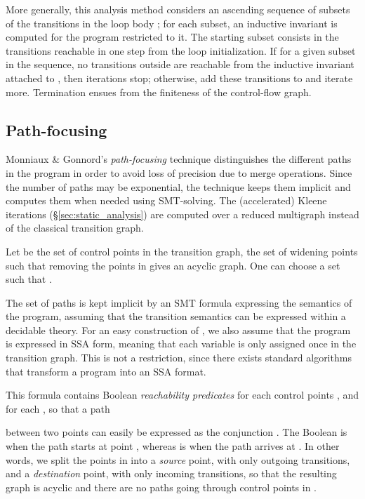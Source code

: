 More generally, this analysis method considers an ascending sequence of subsets of the transitions in the loop body ;
for each subset, an inductive invariant is computed for the program restricted to it.
The starting subset consists in the transitions reachable in one step from the loop initialization.
If for a given subset  in the sequence, no transitions outside  are reachable from the inductive invariant attached to , then iterations stop;
otherwise, add these transitions to  and iterate more.
Termination ensues from the finiteness of the control-flow graph.


\subsection{Path-focusing}
\label{sec:path_focusing}

Monniaux \& Gonnord's \emph{path-focusing} \cite{Monniaux_Gonnord_SAS11} technique
distinguishes the different paths in the program in order to avoid loss of
precision due to merge operations. Since the number of paths may be exponential,
the technique keeps them implicit and computes them when needed using
SMT-solving.
The (accelerated) Kleene iterations (\S\ref{sec:static_analysis}) are computed over a reduced multigraph instead of the classical transition graph.

Let  be the set of control points in the transition graph, 
 the set of widening points
such that removing the points in  gives an acyclic graph.
One can choose a set  such that .

The set of paths is kept implicit by an SMT formula  expressing
the semantics of the program, assuming that the transition semantics can be
expressed within a decidable theory. For an easy construction of , 
we also assume that the program is expressed in SSA form, meaning that each
variable is only assigned once in the transition graph. This is not a
restriction, since there exists standard algorithms that transform a program into
an SSA format.

This formula contains Boolean \emph{reachability predicates}  for each
control points ,  and  for each , so
that a path 
 
between two points  
can easily be expressed as the
conjunction .
The Boolean  is  when the path starts at point , whereas
 is  when the path arrives at . In other words, we split the
points in  into a \emph{source} point, with only outgoing transitions, and
a \emph{destination} point, with only incoming transitions, so that the
resulting graph is acyclic and there are no paths going through control
points in .

